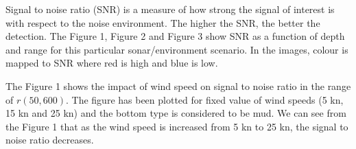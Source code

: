 \noindent Signal to noise ratio (SNR) is a measure of how strong the signal of interest is with respect to the noise environment. The higher the SNR, the better the detection. The Figure 1, Figure 2 and Figure 3 show SNR as a function of depth and range for this particular sonar/environment scenario. In the images, colour is mapped to SNR where red is high and blue is low.



\noindent The Figure 1 shows the impact of wind speed on signal to noise ratio in the range of $\textit{r} (50, 600).$ The figure has been plotted for fixed value of wind speeds (5 kn, 15 kn and 25 kn) and the bottom type is considered to be mud. We can see from the Figure 1 that as the wind speed is increased from 5 kn to 25 kn, the signal to noise ratio decreases.

